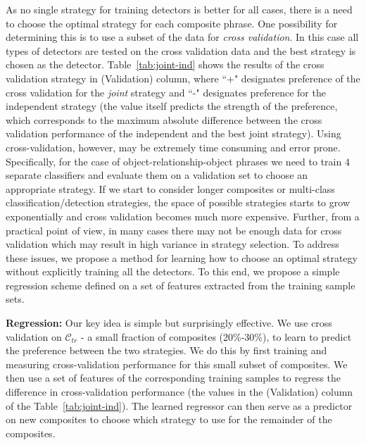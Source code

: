 \documentclass[runningheads]{llncs}
\begin{document}
As no single strategy for training detectors is better for all cases, there is a need to choose the optimal strategy for each composite phrase. One possibility for determining this is to use a subset of the data for \emph{cross validation}. In this case all types of detectors are tested on the cross validation data and the best strategy is chosen as the detector. Table~\ref{tab:joint-ind} shows the results of the cross validation strategy in (Validation) column, where ``+" designates preference of the cross validation for the {\em joint} strategy and ``-" designates preference for the independent strategy (the value itself predicts the strength of the preference, which corresponds to the maximum absolute difference between the cross validation performance of the independent and the best joint strategy). 
Using cross-validation, however, may be extremely time consuming and error prone. Specifically, for the case of object-relationship-object phrases we need to train $4$ separate classifiers and evaluate them on a validation set to choose an appropriate strategy. If we start to consider longer composites or multi-class classification/detection strategies, the space of possible strategies starts to grow exponentially and cross validation becomes much more expensive. Further, from a practical point of view, in many cases there may not be enough data for cross validation which may result in high variance in strategy selection. To address these issues, we propose a method for learning how to choose an optimal strategy without explicitly training all the detectors. To this end, we propose a simple regression scheme defined on a set of features extracted from the training sample sets.

\vspace{0.1in}
\noindent
{\bf Regression:}
Our key idea is simple but surprisingly effective. We use cross validation on $\mathcal{C}_{tr}$ - a small fraction of composites (20\%-30\%), to learn to predict the preference between the two strategies. We do this by first training and measuring cross-validation performance for this small subset of composites. We then use a set of features of the corresponding training samples to regress the difference in cross-validation performance (the values in the (Validation) column of the Table~\ref{tab:joint-ind}). The learned regressor can then serve as a predictor on new composites to choose which strategy to use for the remainder of the composites. 
\end{document}
